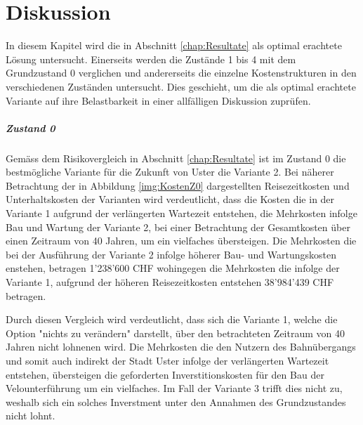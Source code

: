 %
%
%
%

\chapter{Diskussion}
\label{chap:Diskussion}

In diesem Kapitel wird die in Abschnitt \ref{chap:Resultate} als optimal erachtete Lösung untersucht. Einerseits werden die Zustände 1 bis 4 mit dem Grundzustand 0 verglichen und andererseits die einzelne Kostenstrukturen in den verschiedenen Zuständen untersucht. Dies geschieht, um die als optimal erachtete Variante auf ihre Belastbarkeit in einer allfälligen Diskussion zuprüfen.

\paragraph{Zustand 0}

Gemäss dem Risikovergleich in Abschnitt \ref{chap:Resultate} ist im Zustand 0 die bestmögliche Variante für die Zukunft von Uster die Variante 2.  
Bei näherer Betrachtung der in Abbildung \ref{img:KostenZ0} dargestellten Reisezeitkosten und Unterhaltskosten der Varianten wird verdeutlicht, dass die Kosten die in der Variante 1 aufgrund der verlängerten Wartezeit entstehen, die Mehrkosten infolge Bau und Wartung der Variante 2, bei einer Betrachtung der Gesamtkosten über einen Zeitraum von 40 Jahren, um ein vielfaches übersteigen. Die Mehrkosten die bei der Ausführung der Variante 2 infolge höherer Bau- und Wartungskosten enstehen, betragen 1'238'600 CHF wohingegen die Mehrkosten die infolge der Variante 1, aufgrund der höheren Reisezeitkosten entstehen 38'984'439 CHF betragen. 

Durch diesen Vergleich wird verdeutlicht, dass sich die Variante 1, welche die Option "nichts zu verändern" darstellt, über den betrachteten Zeitraum von 40 Jahren nicht lohnenen wird. Die Mehrkosten die den Nutzern des Bahnübergangs und somit auch indirekt der Stadt Uster infolge der verlängerten Wartezeit entstehen, übersteigen die geforderten Inverstitionskosten für den Bau der Velounterführung um ein vielfaches. Im Fall der Variante 3 trifft dies nicht zu, weshalb sich ein solches Inverstment unter den Annahmen des Grundzustandes nicht lohnt.

